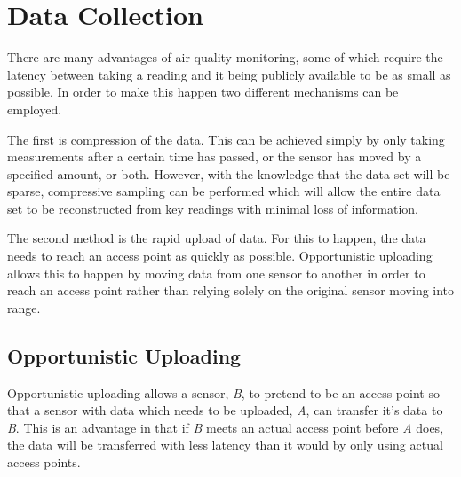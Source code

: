 \section{Data Collection}\label{datacollection}

There are many advantages of air quality monitoring, some of which require the latency between taking a reading and it being publicly available to be as small as possible. In order to make this happen two different mechanisms can be employed. 

The first is compression of the data. This can be achieved simply by only taking measurements after a certain time has passed, or the sensor has moved by a specified amount, or both. However, with the knowledge that the data set will be sparse, compressive sampling can be performed which will allow the entire data set to be reconstructed from key readings with minimal loss of information. 

The second method is the rapid upload of data. For this to happen, the data needs to reach an access point as quickly as possible. Opportunistic uploading allows this to happen by moving data from one sensor to another in order to reach an access point rather than relying solely on the original sensor moving into range. 

\subsection{Opportunistic Uploading}\label{opportunisticuploading}

Opportunistic uploading allows a sensor, \emph{B}, to pretend to be an access point so that a sensor with data which needs to be uploaded, \emph{A}, can transfer it's data to \emph{B}. This is an advantage in that if \emph{B} meets an actual access point before \emph{A} does, the data will be transferred with less latency than it would by only using actual access points. 

